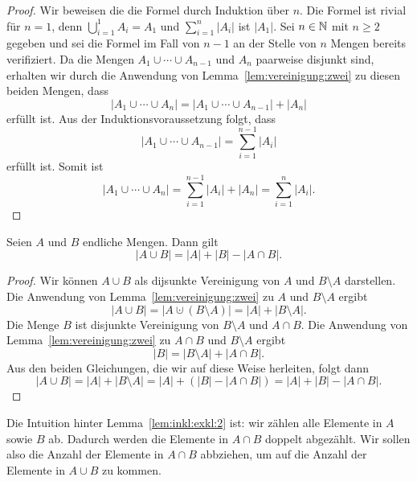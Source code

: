 \begin{proof} 
	Wir beweisen die die Formel durch Induktion über $n$. 
	Die Formel ist rivial für $n=1$, denn $\bigcup_{i=1}^1 A_i = A_1$ und $\sum_{i=1}^n |A_i|$ ist $|A_1|$. 
	Sei $n \in \mathbb{N}$ mit $n \ge 2$ gegeben und sei die Formel im Fall von $n-1$ an der Stelle von $n$ Mengen bereits verifiziert. Da die Mengen $A_1 \cup \cdots \cup A_{n-1}$ und $A_n$ paarweise disjunkt sind, erhalten wir durch die Anwendung von Lemma~\ref{lem:vereinigung:zwei} zu diesen beiden Mengen, dass 
	\[
		| A_1 \cup \cdots \cup A_n| = |A_1 \cup \cdots \cup A_{n-1} | + |A_n| 
	\]
	erfüllt ist. Aus der Induktionsvoraussetzung folgt, dass 
	\[
		| A_1 \cup \cdots \cup A_{n-1} | = \sum_{i=1}^{n-1} |A_i|
	\]
	erfüllt ist. Somit ist 
	\[
		| A_1 \cup \cdots \cup A_n| = \sum_{i=1}^{n-1} |A_i|  + |A_n| = \sum_{i=1}^n |A_i|. 
	\]
\end{proof} 

\begin{lem} \label{lem:inkl:exkl:2}
	Seien $A$ und $B$ endliche Mengen. Dann gilt 
	\[
		|A \cup B| = |A| + |B| - |A \cap B|. 
	\]
\end{lem}

\begin{proof}
		Wir können $A \cup B$ als dijsunkte Vereinigung von $A$ und $B \setminus A$ darstellen. Die Anwendung von Lemma~\ref{lem:vereinigung:zwei} zu $A$ und $B \setminus A$ ergibt 
		\[
			| A \cup B| = |A \cupdot (B \setminus A)| = |A | + |B \setminus A|. 
		\]
		Die Menge $B$ ist disjunkte Vereinigung von $B \setminus A$ und $A \cap B$. Die Anwendung von Lemma~\ref{lem:vereinigung:zwei} zu $A \cap B$ und $B \setminus A$ ergibt
		\[
			|B| = |B \setminus A| + |A \cap B|. 
		\]
		Aus den beiden Gleichungen, die wir auf diese Weise herleiten, folgt dann 
		\[
			| A \cup B|  = |A | + |B \setminus A| = |A| + (|B| - | A \cap B|) = |A| + |B| - | A \cap B|. 
		\]
\end{proof} 

\begin{bem}
	Die Intuition hinter Lemma~\ref{lem:inkl:exkl:2} ist: wir zählen alle Elemente in $A$ sowie $B$ ab. Dadurch werden die Elemente in $A \cap B$ doppelt abgezählt. Wir sollen also die Anzahl der Elemente in $A \cap B$ abbziehen, um auf die Anzahl der Elemente in $A \cup B$ zu kommen. 
\end{bem} 



